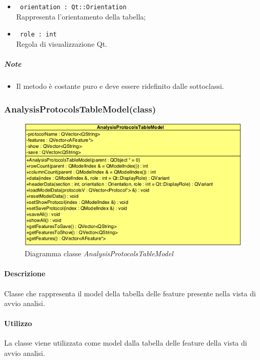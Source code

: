\begin{itemize}
\begin{itemize}
			\item \color{RoyalPurple}\verb! orientation : Qt::Orientation!\\
			\color{black}Rappresenta l'orientamento della tabella;
			
			\item \color{RoyalPurple}\verb! role : int!\\
			\color{black}Regola di visualizzazione Qt\g{}.
		\end{itemize}
	\subparagraph{Note}
			\begin{itemize}
				\item Il metodo è costante puro e deve essere ridefinito dalle sottoclassi.
			\end{itemize}
\end{itemize}
\pagebreak


\subsubsection{AnalysisProtocolsTableModel(class)}
\label{AnalysisProtocolsTableModel}
\begin{figure}[!h]
	\centering
	\includegraphics[width=0.6\linewidth]{./Content/Immagini/QtModel/AnalysisProtocolsTableModel.png}
	\caption{Diagramma classe \textsl{AnalysisProtocolsTableModel}}
	\label{comp_AnalysisProtocolsTableModel}
\end{figure}

\paragraph{Descrizione\\} 
Classe che rappresenta il model della tabella delle feature\g{} presente nella vista di avvio analisi.

\paragraph{Utilizzo\\}
La classe viene utilizzata come model dalla tabella delle feature\g{} della vista di avvio analisi.

